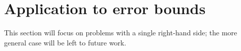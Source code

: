 \documentclass{article}
\newcommand{\ts}{^T}
\DeclareMathOperator{\Diag}{diag}
\newcommand{\KW}{Karlson-Wald\'{e}n~}
\begin{document}

\section{Application to error bounds} \label{sec:application_error_bounds}
This section will focus on problems with a single right-hand side; the more general case will be left to future work. 



\end{document}

